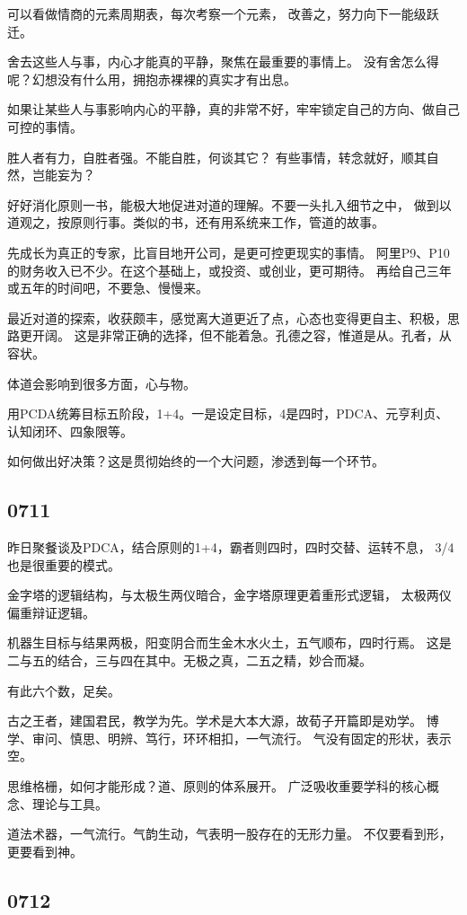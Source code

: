 可以看做情商的元素周期表，每次考察一个元素，
改善之，努力向下一能级跃迁。

舍去这些人与事，内心才能真的平静，聚焦在最重要的事情上。
没有舍怎么得呢？幻想没有什么用，拥抱赤裸裸的真实才有出息。

如果让某些人与事影响内心的平静，真的非常不好，牢牢锁定自己的方向、做自己可控的事情。

胜人者有力，自胜者强。不能自胜，何谈其它？
有些事情，转念就好，顺其自然，岂能妄为？

好好消化原则一书，能极大地促进对道的理解。不要一头扎入细节之中，
做到以道观之，按原则行事。类似的书，还有用系统来工作，管道的故事。

先成长为真正的专家，比盲目地开公司，是更可控更现实的事情。
阿里P9、P10的财务收入已不少。在这个基础上，或投资、或创业，更可期待。
再给自己三年或五年的时间吧，不要急、慢慢来。

最近对道的探索，收获颇丰，感觉离大道更近了点，心态也变得更自主、积极，思路更开阔。
这是非常正确的选择，但不能着急。孔德之容，惟道是从。孔者，从容状。

体道会影响到很多方面，心与物。

用PCDA统筹目标五阶段，1+4。一是设定目标，4是四时，PDCA、元亨利贞、认知闭环、四象限等。

如何做出好决策？这是贯彻始终的一个大问题，渗透到每一个环节。

\subsection{0711}

昨日聚餐谈及PDCA，结合原则的1+4，霸者则四时，四时交替、运转不息，
3/4也是很重要的模式。

金字塔的逻辑结构，与太极生两仪暗合，金字塔原理更着重形式逻辑，
太极两仪偏重辩证逻辑。

机器生目标与结果两极，阳变阴合而生金木水火土，五气顺布，四时行焉。
这是二与五的结合，三与四在其中。无极之真，二五之精，妙合而凝。

有此六个数，足矣。

古之王者，建国君民，教学为先。学术是大本大源，故荀子开篇即是劝学。
博学、审问、慎思、明辨、笃行，环环相扣，一气流行。
气没有固定的形状，表示空。

思维格栅，如何才能形成？道、原则的体系展开。
广泛吸收重要学科的核心概念、理论与工具。

道法术器，一气流行。气韵生动，气表明一股存在的无形力量。
不仅要看到形，更要看到神。

\subsection{0712}

